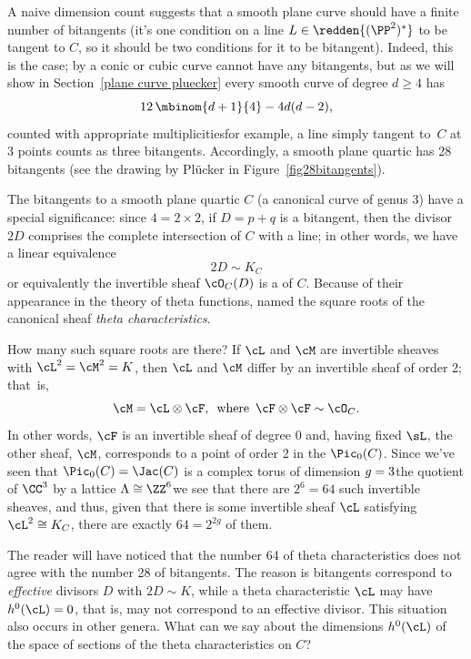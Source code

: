 A naive dimension count suggests that a smooth plane curve should have
a finite number of bitangents (it's one condition on a line $L \in
\redden{(\PP^2)^*}
$ to be tangent to $C$, so it should be two conditions for
it to be bitangent). Indeed, this is the case; by
%
a
conic or cubic curve cannot have any bitangents, but as we will show in
Section~\ref{plane curve pluecker} every smooth curve of degree $d \geq
4$ has
$$
12\,\mbinom{d+1}{4} - 4d(d-2),
$$
counted with appropriate multiplicities\emdash for example, a line simply
tangent to~$C$ at 3 points  counts as three bitangents. Accordingly,
%
%
a smooth plane quartic has 28 bitangents (see the drawing by Pl\"ucker
in Figure~\ref{fig28bitangents}).

The bitangents to a smooth plane quartic $C$ (a canonical curve of genus
3) have a special significance: since $4 = 2 \times 2$, if $D = p+q$ is
a bitangent, then the divisor $2D$ comprises the complete intersection
of $C$ with a line; in other words, we have a linear equivalence
$$
2D \sim K_C
$$
or equivalently the invertible sheaf $\cO_C(D)$ is a
%
%
of $C$. Because of their appearance in the theory of
%
theta functions,
%
named the square roots of the canonical sheaf
\emph{theta characteristics}.

How many such square roots are there? If $\cL$ and $\cM$ are invertible
sheaves with $\cL^2 = \cM^2 = K$, then $\cL$ and $\cM$ differ by an
invertible sheaf of order 2; that~is,
$$
\cM = \cL \otimes \cF, \quad \text{where} \quad \cF \otimes \cF \sim
\cO_C.
$$
In other words, $\cF$ is an invertible sheaf of degree 0 and, having
fixed $\sL$,  the other sheaf, $\cM$, corresponds to a point of order
2 in the
%
$\Pic_0(C)$. Since we've seen that $\Pic_0(C) =
\Jac(C)$ is a complex torus of dimension
$g =\nobreak 3$\emdash the quotient of $\CC^3$
by a lattice $\Lambda \cong \ZZ^6$\emdash we see that there are $2^6 = 64$
such invertible sheaves, and thus, given that there is some invertible
sheaf $\cL$ satisfying $\cL^2 \cong K_C$, there are exactly $64 = 2^{2g}$
of them.

The reader will have noticed that the number 64 of theta characteristics
does not agree with the number 28 of bitangents. The reason is
bitangents correspond to \emph{effective} divisors $D$ with $2D
\sim K$, while a theta characteristic $\cL$ may have $h^0(\cL) = 0$,
that is, may not correspond to an effective divisor.
This situation also occurs in other genera.
What can we say about the dimensions $h^0(\cL)$ of the space of sections
of the theta characteristics on $C$?


